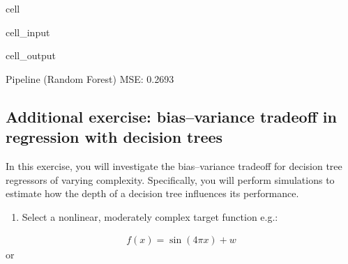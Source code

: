 \documentclass[letterpaper,10pt,english]{jupyterBook}
\begin{document}
\begin{sphinxuseclass}{cell}
\begin{sphinxVerbatimInput}
\begin{sphinxuseclass}{cell_input}
\end{sphinxuseclass}\end{sphinxVerbatimInput}
\begin{sphinxVerbatimOutput}

\begin{sphinxuseclass}{cell_output}
\begin{sphinxVerbatim}[commandchars=\\\{\}]
Pipeline (Random Forest) MSE: 0.2693
\end{sphinxVerbatim}

\end{sphinxuseclass}\end{sphinxVerbatimOutput}

\end{sphinxuseclass}

\subsection{Additional exercise: bias–variance trade\sphinxhyphen{}off in regression with decision trees}
\label{\detokenize{03:additional-exercise-biasvariance-trade-off-in-regression-with-decision-trees}}
\sphinxAtStartPar
In this exercise, you will investigate the bias–variance trade\sphinxhyphen{}off for decision tree regressors of varying complexity. Specifically, you will perform simulations to estimate how the depth of a decision tree influences its performance.
\begin{enumerate}
%
\item {} 
\sphinxAtStartPar
Select a nonlinear, moderately complex target function e.g.:

\end{enumerate}
\begin{equation*}
\begin{split}f(x) = \sin(4\pi x) + w\end{split}
\end{equation*}
\sphinxAtStartPar
or
\end{document}
